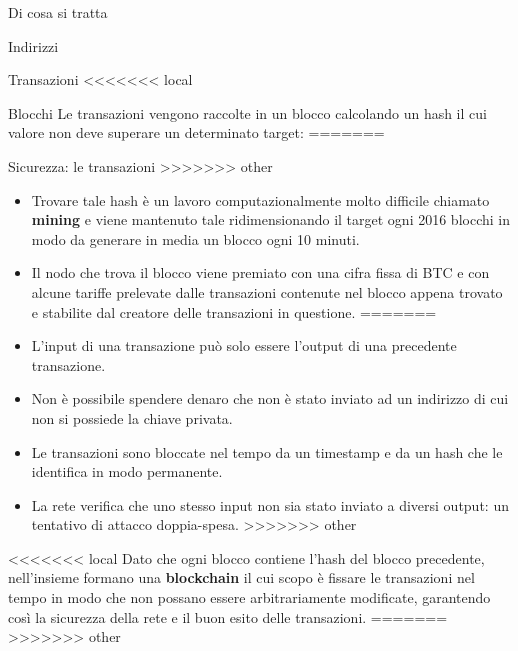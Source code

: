 \documentclass[italian]{beamer}
\begin{document}
\begin{frame}{Di cosa si tratta}
\begin{frame}{Indirizzi}
\begin{frame}{Transazioni}
<<<<<<< local
\begin{frame}{Blocchi} %
Le transazioni vengono raccolte in un blocco calcolando un hash il cui valore non deve superare un determinato target:
=======
\begin{frame}{Sicurezza: le transazioni}
>>>>>>> other
\begin{itemize}
<<<<<<< local
 \item Trovare tale hash è un lavoro computazionalmente molto difficile chiamato \textbf{mining} e viene mantenuto tale ridimensionando il target ogni 2016 blocchi in modo da generare in media un blocco ogni 10 minuti.
 \item Il nodo che trova il blocco viene premiato con una cifra fissa di BTC e con alcune tariffe prelevate dalle transazioni contenute nel blocco appena trovato e stabilite dal creatore delle transazioni in questione.
=======
    \item L'input di una transazione può solo essere l'output di una precedente transazione.
    \item Non è possibile spendere denaro che non è stato inviato ad un indirizzo di cui non si possiede la chiave privata.
    \item Le transazioni sono bloccate nel tempo da un timestamp e da un hash che le identifica in modo permanente.
    \item La rete verifica che uno stesso input non sia stato inviato a diversi output: un tentativo di attacco doppia-spesa.
>>>>>>> other
\end{itemize}
<<<<<<< local
Dato che ogni blocco contiene l'hash del blocco precedente, nell'insieme formano una \textbf{blockchain} il cui scopo è fissare le transazioni nel tempo in modo che non possano essere arbitrariamente modificate, garantendo così la sicurezza della rete e il buon esito delle transazioni.
=======
>>>>>>> other
\end{frame}


\end{frame}
\end{frame}
\end{frame}
\end{frame}
\end{document}
